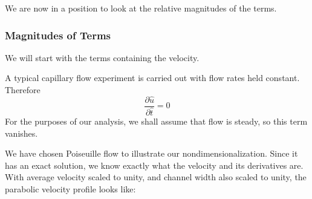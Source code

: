 \documentclass[a4paper]{report}
\begin{document}
\vspace{1em}
We are now in a position to look at the relative magnitudes of the terms.

\subsubsection*{Magnitudes of Terms}

We will start with the terms containing the velocity.
\vspace{1em}

A typical capillary flow experiment is carried out with flow rates held constant. Therefore
\begin{equation}
\frac{\partial \hat{u}}{\partial \hat{t}} = 0
\end{equation}
For the purposes of our analysis, we shall assume that flow is steady, so this term vanishes.


%

\vspace{1em}
We have chosen Poiseuille flow to illustrate our nondimensionalization.  Since it has an exact solution, we know exactly what the velocity and its derivatives are.  With average velocity scaled to unity, and channel width also scaled to unity, the parabolic velocity profile looks like:
\end{document}
